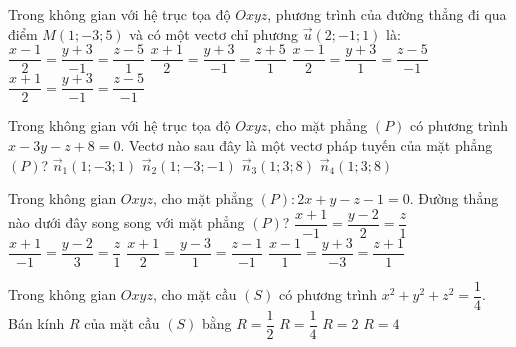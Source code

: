 \begin{vd}[MH-2025]%
    Trong không gian với hệ trục tọa độ $Oxyz$, phương trình của đường thẳng đi qua điểm $M(1;-3;5)$ và có một vectơ chỉ phương $\overrightarrow{u}(2;-1;1)$ là:
    \choice
    {$\dfrac{x-1}{2} = \dfrac{y+3}{-1} = \dfrac{z-5}{1}$}
    {$\dfrac{x+1}{2} = \dfrac{y+3}{-1} = \dfrac{z+5}{1}$}
    {\True $\dfrac{x-1}{2} = \dfrac{y+3}{1} = \dfrac{z-5}{-1}$}
    {$\dfrac{x+1}{2} = \dfrac{y+3}{-1} = \dfrac{z-5}{-1}$}
\end{vd}
\begin{vd}[MH-2025]%
    Trong không gian với hệ trục tọa độ $Oxyz$, cho mặt phẳng $(P)$ có phương trình $x - 3y - z + 8 = 0$. Vectơ nào sau đây là một vectơ pháp tuyến của mặt phẳng $(P)$?
    \choice
    {$\overrightarrow{n}_1(1;-3;1)$}
    {\True $\overrightarrow{n}_2(1;-3;-1)$}
    {$\overrightarrow{n}_3(1;3;8)$}
    {$\overrightarrow{n}_4(1;3;8)$}
\end{vd}
\begin{vd}%
    Trong không gian  $Oxyz$, cho mặt phẳng $(P) \colon 2x+y-z-1=0$. Đường thẳng nào dưới đây song song với mặt phẳng $(P)$?
    \choice
    {$\dfrac{x+1}{-1}=\dfrac{y-2}{2}=\dfrac{z}{1}$}
    {\True $\dfrac{x+1}{-1}=\dfrac{y-2}{3}=\dfrac{z}{1}$}
    {$\dfrac{x+1}{2}=\dfrac{y-3}{1}=\dfrac{z-1}{-1}$}
    {$\dfrac{x-1}{1}=\dfrac{y+3}{-3}=\dfrac{z+1}{1}$}
\end{vd}
\begin{vd}%
    Trong không gian $Oxyz$, cho mặt cầu $(S)$ có phương trình $x^2 + y^2 + z^2 = \dfrac{1}{4}$. Bán kính $R$ của mặt cầu $(S)$ bằng
    \choice
    {\True $R = \dfrac{1}{2}$}
    {$R = \dfrac{1}{4}$}
    {$R = 2$}
    {$R = 4$}
\end{vd}
